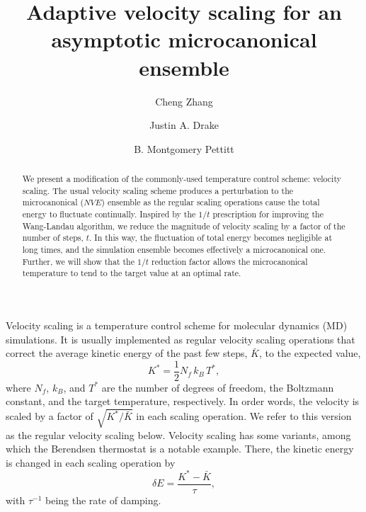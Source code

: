 \documentclass[reprint]{revtex4-1}
\begin{document}
\title{Adaptive velocity scaling for an asymptotic
microcanonical ensemble}

\author{Cheng Zhang}
\author{Justin A. Drake}
\author{B. Montgomery Pettitt}

\begin{abstract}
  We present a modification of the commonly-used
  temperature control scheme: velocity scaling.
  The usual velocity scaling scheme produces a perturbation to
  the microcanonical ($NVE$) ensemble
  as the regular scaling operations cause the total energy to fluctuate continually.
  Inspired by the $1/t$ prescription for improving the Wang-Landau algorithm,
  we reduce
  the magnitude of velocity scaling
  by a factor of the number of steps, $t$.
  In this way,
  the fluctuation of total energy becomes negligible at long times,
  and the simulation ensemble becomes effectively
  a microcanonical one.
  Further, we will show that the $1/t$ reduction factor
  allows the microcanonical temperature to tend to the target value
  at an optimal rate.
\end{abstract}

\maketitle



Velocity scaling is a temperature control scheme
for molecular dynamics (MD) simulations.
%
It is usually implemented as
regular velocity scaling operations
that correct the average
kinetic energy of the past few steps, $\bar K$,
to the expected value\cite{frenkel, haile},
%
\begin{equation}
  K^* = \frac{1}{2} N_f \, k_B \, T^*
  ,
  \label{eq:K_canon}
\end{equation}
%
where $N_f$, $k_B$, and $T^*$ are the number of degrees of freedom,
the Boltzmann constant, and the target temperature, respectively.
%
In order words,
the velocity is scaled by a factor of
$\sqrt{ K^* / \bar K }$
in each scaling operation.
%
We refer to this version as the regular velocity scaling below.
%
Velocity scaling has some variants,
among which
the Berendsen thermostat\cite{berendsen1984}
is a notable example.
%
There,
the kinetic energy is changed in each scaling operation
by
%
\begin{equation}
  \delta E = \frac{ K^* - \bar K } { \tau },
  \label{eq:Berendsen}
\end{equation}
%
with $\tau^{-1}$ being the rate of damping.
\end{document}
